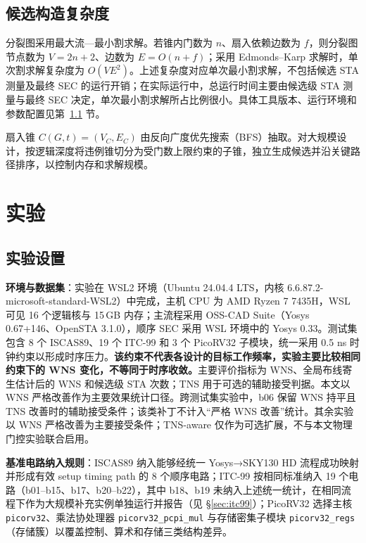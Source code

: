 \documentclass[twocolumn,10pt,fontset=windows]{ctexart}
\begin{document}
\subsection{候选构造复杂度}\label{sec:impl}

分裂图采用最大流—最小割求解。若锥内门数为 $n$、扇入依赖边数为 $f$，则分裂图节点数为 $V=2n+2$、边数为 $E=O(n+f)$；采用 Edmonds--Karp 求解时，单次割求解复杂度为 $O(VE^2)$。上述复杂度对应单次最小割求解，不包括候选 STA 测量及最终 SEC 的运行开销；在实际运行中，总运行时间主要由候选级 STA 测量与最终 SEC 决定，单次最小割求解所占比例很小。具体工具版本、运行环境和参数配置见第~\ref{sec:setup} 节。

扇入锥 $C(G, t) = (V_C, E_C)$ 由反向广度优先搜索（BFS）抽取。对大规模设计，按逻辑深度将违例锥切分为受门数上限约束的子锥，独立生成候选并沿关键路径排序，以控制内存和求解规模。

\section{实验}\label{sec:exp}

\subsection{实验设置}\label{sec:setup}

\textbf{环境与数据集}：实验在 WSL2 环境（Ubuntu 24.04.4 LTS，内核 6.6.87.2-microsoft-standard-WSL2）中完成，主机 CPU 为 AMD Ryzen 7 7435H，WSL 可见 16 个逻辑核与 15\,GB 内存；主流程采用 OSS-CAD Suite（Yosys 0.67+146、OpenSTA 3.1.0），顺序 SEC 采用 WSL 环境中的 Yosys 0.33。测试集包含 8 个 ISCAS89、19 个 ITC-99 和 3 个 PicoRV32 子模块，统一采用 0.5 ns 时钟约束以形成时序压力。\textbf{该约束不代表各设计的目标工作频率，实验主要比较相同约束下的 WNS 变化，不等同于时序收敛。}主要评价指标为 WNS、全局布线寄生估计后的 WNS 和候选级 STA 次数；TNS 用于可选的辅助接受判据。本文以 WNS 严格改善作为主要效果统计口径。跨测试集实验中，b06 保留 WNS 持平且 TNS 改善时的辅助接受条件；该类补丁不计入“严格 WNS 改善”统计。其余实验以 WNS 严格改善为主要接受条件；TNS-aware 仅作为可选扩展，不与本文物理门控实验联合启用。

\textbf{基准电路纳入规则}：ISCAS89 纳入能够经统一 Yosys→SKY130 HD 流程成功映射并形成有效 setup timing path 的 8 个顺序电路；ITC-99 按相同标准纳入 19 个电路（b01--b15、b17、b20--b22），其中 b18、b19 未纳入上述统一统计，在相同流程下作为大规模补充实例单独运行并报告（见 \S\ref{sec:itc99}）；PicoRV32 选择主核 \texttt{picorv32}、乘法协处理器 \texttt{picorv32\_pcpi\_mul} 与存储密集子模块 \texttt{picorv32\_regs}（存储簇）以覆盖控制、算术和存储三类结构差异。
\end{document}
